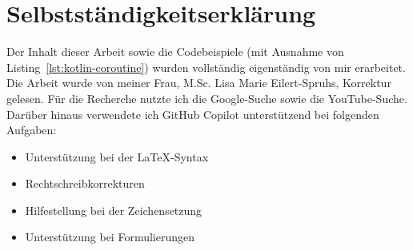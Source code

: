 \documentclass[11pt]{article}
\begin{document}
    \printbibliography[
        heading=bibintoc,
        title={Literaturverzeichnis}
    ]
    \clearpage
    \appendix

    \section{Selbstständigkeitserklärung}
    
    Der Inhalt dieser Arbeit sowie die Codebeispiele (mit Ausnahme von Listing~\ref{lst:kotlin-coroutine}) wurden vollständig eigenständig von mir erarbeitet.
    Die Arbeit wurde von meiner Frau, M.Sc. Lisa Marie Eilert-Spruhs, Korrektur gelesen.
    Für die Recherche nutzte ich die Google-Suche sowie die YouTube-Suche.
    Darüber hinaus verwendete ich GitHub Copilot unterstützend bei folgenden Aufgaben:
    \begin{itemize}
        \item Unterstützung bei der LaTeX-Syntax
        \item Rechtschreibkorrekturen
        \item Hilfestellung bei der Zeichensetzung
        \item Unterstützung bei Formulierungen
    \end{itemize}
\end{document}
